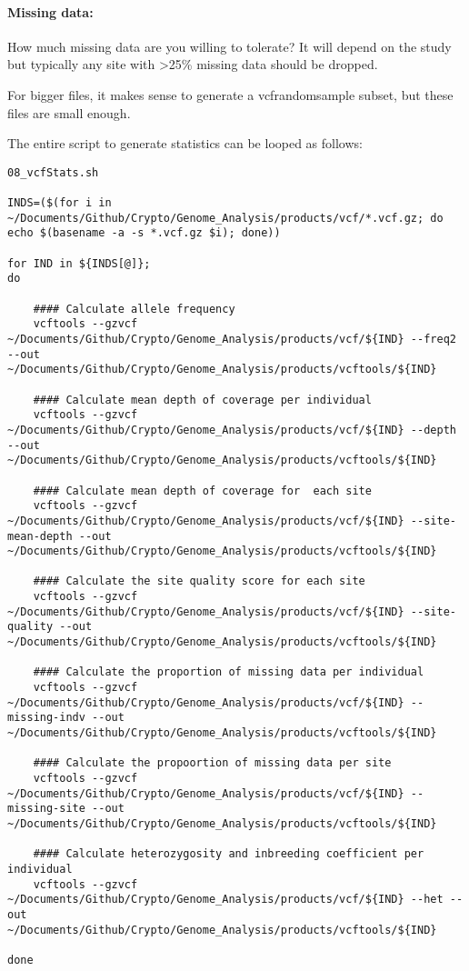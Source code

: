 \documentclass[
]{article}
\begin{document}
\hypertarget{missing-data}{%
\paragraph{Missing data:}\label{missing-data}}

How much missing data are you willing to tolerate? It will depend on the
study but typically any site with \textgreater25\% missing data should
be dropped.

For bigger files, it makes sense to generate a vcfrandomsample subset,
but these files are small enough.

The entire script to generate statistics can be looped as follows:

\begin{verbatim}
08_vcfStats.sh

INDS=($(for i in ~/Documents/Github/Crypto/Genome_Analysis/products/vcf/*.vcf.gz; do echo $(basename -a -s *.vcf.gz $i); done))

for IND in ${INDS[@]};
do

    #### Calculate allele frequency
    vcftools --gzvcf ~/Documents/Github/Crypto/Genome_Analysis/products/vcf/${IND} --freq2 --out ~/Documents/Github/Crypto/Genome_Analysis/products/vcftools/${IND}

    #### Calculate mean depth of coverage per individual
    vcftools --gzvcf ~/Documents/Github/Crypto/Genome_Analysis/products/vcf/${IND} --depth --out ~/Documents/Github/Crypto/Genome_Analysis/products/vcftools/${IND}

    #### Calculate mean depth of coverage for  each site
    vcftools --gzvcf ~/Documents/Github/Crypto/Genome_Analysis/products/vcf/${IND} --site-mean-depth --out ~/Documents/Github/Crypto/Genome_Analysis/products/vcftools/${IND}

    #### Calculate the site quality score for each site
    vcftools --gzvcf ~/Documents/Github/Crypto/Genome_Analysis/products/vcf/${IND} --site-quality --out ~/Documents/Github/Crypto/Genome_Analysis/products/vcftools/${IND}

    #### Calculate the proportion of missing data per individual
    vcftools --gzvcf ~/Documents/Github/Crypto/Genome_Analysis/products/vcf/${IND} --missing-indv --out ~/Documents/Github/Crypto/Genome_Analysis/products/vcftools/${IND}

    #### Calculate the propoortion of missing data per site
    vcftools --gzvcf ~/Documents/Github/Crypto/Genome_Analysis/products/vcf/${IND} --missing-site --out ~/Documents/Github/Crypto/Genome_Analysis/products/vcftools/${IND}

    #### Calculate heterozygosity and inbreeding coefficient per individual
    vcftools --gzvcf ~/Documents/Github/Crypto/Genome_Analysis/products/vcf/${IND} --het --out      ~/Documents/Github/Crypto/Genome_Analysis/products/vcftools/${IND}

done
\end{verbatim}
\end{document}
